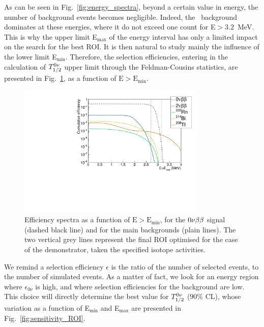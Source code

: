 As can be seen in Fig.~\ref{fig:energy_spectra}, beyond a certain value in energy, the number of background events becomes negligible.
Indeed, the \Tl\ background dominates at these energies, where it do not exceed one count for E$>3.2$~MeV.
This is why the upper limit E$_{\text{max}}$ of the energy interval has only a limited impact on the search for the best ROI.
It is then natural to study mainly the influence of the lower limit E$_{\text{min}}$.
Therefore, the selection efficiencies, entering in the calculation of $T_{1/2}^{0\nu}$ upper limit through the Feldman-Cousins statistics, are presented in Fig.~\ref{fig:efficiency_spectra}, as a function of $\text{E}>\text{E}_{\text{min}}$.
\begin{figure}[h]
  \centering
  \includegraphics[width=0.8\textwidth]{Sensitivity/fig_sensitivity/efficiency_spectrum_with_B_82Se.pdf}
  \caption{Efficiency spectra as a function of $\text{E}>\text{E}_{\text{min}}$, for the $0\nu\beta\beta$ signal (dashed black line) and for the main backgrounds (plain lines).
    The two vertical grey lines represent the final ROI optimised for the case of the demonstrator, taken the specified isotope activities.
    \label{fig:efficiency_spectra}}
\end{figure}
We remind a selection efficiency $\epsilon$ is the ratio of the number of selected events, to the number of simulated events.
As a matter of fact, we look for an energy region where $\epsilon_{0\nu}$ is high, and where selection efficiencies for the background are low.
This choice will directly determine the best value for $T_{1/2}^{0\nu}$ ($90\%$ CL), whose variation as a function of E$_{\text{min}}$ and E$_{\text{max}}$ are presented in Fig.~\ref{fig:sensitivity_ROI}.
